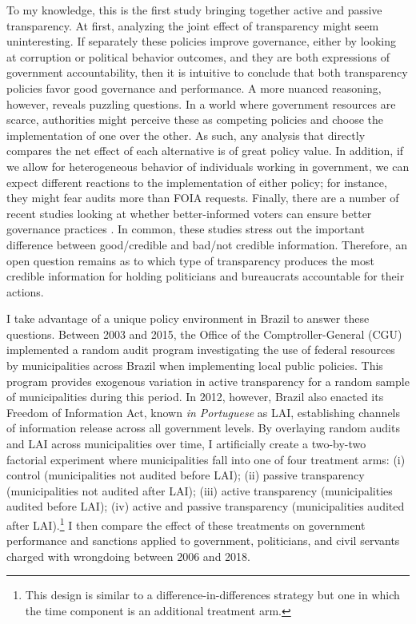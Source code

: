 \documentclass[11pt]{article}
\begin{document}
To my knowledge, this is the first study bringing together active and passive transparency. At first, analyzing the joint effect of transparency might seem uninteresting. If separately these policies improve governance, either by looking at corruption or political behavior outcomes, and they are both expressions of government accountability, then it is intuitive to conclude that both transparency policies favor good governance and performance. A more nuanced reasoning, however, reveals puzzling questions. In a world where government resources are scarce, authorities might perceive these as competing policies and choose the implementation of one over the other. As such, any analysis that directly compares the net effect of each alternative is of great policy value. In addition, if we allow for heterogeneous behavior of individuals working in government, we can expect different reactions to the implementation of either policy; for instance, they might fear audits more than FOIA requests. Finally, there are a number of recent studies looking at whether better-informed voters can ensure better governance practices \citep{PandeCaninformedvoters2011,WintersLackingInformationCondoning2013,ChongDoesCorruptionInformation2015,Weitz-ShapiroCanCitizensDiscern2017}. In common, these studies stress out the important difference between good/credible and bad/not credible information. Therefore, an open question remains as to which type of transparency produces the most credible information for holding politicians and bureaucrats accountable for their actions.

I take advantage of a unique policy environment in Brazil to answer these questions. Between 2003 and 2015, the Office of the Comptroller-General (CGU) implemented a random audit program investigating the use of federal resources by municipalities across Brazil when implementing local public policies. This program provides exogenous variation in active transparency for a random sample of municipalities during this period. In 2012, however, Brazil also enacted its Freedom of Information Act, known  \emph{in Portuguese} as LAI, establishing channels of information release across all government levels. By overlaying random audits and LAI across municipalities over time, I artificially create a two-by-two factorial experiment where municipalities fall into one of four treatment arms: (i) control (municipalities not audited before LAI); (ii) passive transparency (municipalities not audited after LAI); (iii) active transparency (municipalities audited before LAI); (iv) active and passive transparency (municipalities audited after LAI).\footnote{This design is similar to a difference-in-differences strategy but one in which the time component is an additional treatment arm.} I then compare the effect of these treatments on government performance and sanctions applied to government, politicians, and civil servants charged with wrongdoing between 2006 and 2018.
\end{document}
